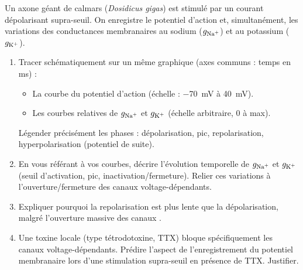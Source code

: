 \documentclass[11pt]{article}
\begin{document}
\begin{exercice}
Un axone géant de calmars (\textit{Dosidicus gigas}) est stimulé par un courant dépolarisant supra-seuil. On enregistre le potentiel d'action et, simultanément, les variations des conductances membranaires au sodium ($g_{\ce{Na+}}$) et au potassium ($g_{\ce{K+}}$).
\begin{enumerate}
    \item Tracer schématiquement sur un même graphique (axes communs : temps en ms) : 
    \begin{itemize}
        \item La courbe du potentiel d'action (échelle : \SI{-70}{\milli\volt} à \SI{+40}{\milli\volt}).
        \item Les courbes relatives de $g_{\ce{Na+}}$ et $g_{\ce{K+}}$ (échelle arbitraire, 0 à max).
    \end{itemize}
    Légender précisément les phases : dépolarisation, pic, repolarisation, hyperpolarisation (potentiel de suite).
    \item En vous référant à vos courbes, décrire l'évolution temporelle de $g_{\ce{Na+}}$ et $g_{\ce{K+}}$ (seuil d'activation, pic, inactivation/fermeture). Relier ces variations à l'ouverture/fermeture des canaux voltage-dépendants.
    \item Expliquer pourquoi la repolarisation est plus lente que la dépolarisation, malgré l'ouverture massive des canaux .
    \item Une toxine locale (type tétrodotoxine, TTX) bloque spécifiquement les canaux  voltage-dépendants. Prédire l'aspect de l'enregistrement du potentiel membranaire lors d'une stimulation supra-seuil en présence de TTX. Justifier.
\end{enumerate}
\end{exercice}
\end{document}
